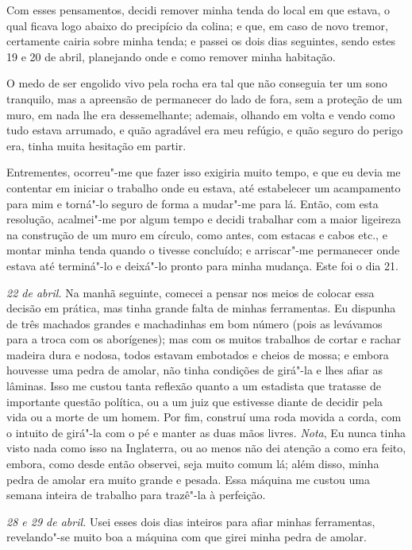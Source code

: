 Com esses pensamentos, decidi remover minha tenda do local em que
estava, o qual ficava logo abaixo do precipício da colina; e que, em
caso de novo tremor, certamente cairia sobre minha tenda; e passei os
dois dias seguintes, sendo estes 19 e 20 de abril, planejando onde e
como remover minha habitação.

O medo de ser engolido vivo pela rocha era tal que não conseguia ter um
sono tranquilo, mas a apreensão de permanecer do lado de fora, sem a
proteção de um muro, em nada lhe era dessemelhante; ademais, olhando em
volta e vendo como tudo estava arrumado, e quão agradável era meu
refúgio, e quão seguro do perigo era, tinha muita hesitação em partir.

Entrementes, ocorreu"-me que fazer isso exigiria muito tempo, e que eu
devia me contentar em iniciar o trabalho onde eu estava, até estabelecer
um acampamento para mim e torná"-lo seguro de forma a mudar"-me para lá.
Então, com esta resolução, acalmei"-me por algum tempo e decidi trabalhar
com a maior ligeireza na construção de um muro em círculo, como antes,
com estacas e cabos etc., e montar minha tenda quando o tivesse
concluído; e arriscar"-me permanecer onde estava até terminá"-lo e
deixá"-lo pronto para minha mudança. Este foi o dia 21.

\emph{22 de abril.} Na manhã seguinte, comecei a pensar nos meios de
colocar essa decisão em prática, mas tinha grande falta de minhas
ferramentas. Eu dispunha de três machados grandes e machadinhas em bom
número (pois as levávamos para a troca com os aborígenes); mas com os
muitos trabalhos de cortar e rachar madeira dura e nodosa, todos estavam
embotados e cheios de mossa; e embora houvesse uma pedra de amolar, não
tinha condições de girá"-la e lhes afiar as lâminas. Isso me custou tanta
reflexão quanto a um estadista que tratasse de importante questão
política, ou a um juiz que estivesse diante de decidir pela vida ou a
morte de um homem. Por fim, construí uma roda movida a corda, com o
intuito de girá"-la com o pé e manter as duas mãos livres. \emph{Nota},
Eu nunca tinha visto nada como isso na Inglaterra, ou ao menos não dei
atenção a como era feito, embora, como desde então observei, seja muito
comum lá; além disso, minha pedra de amolar era muito grande e pesada.
Essa máquina me custou uma semana inteira de trabalho para trazê"-la à
perfeição.

\emph{28 e 29 de abril.} Usei esses dois dias inteiros para afiar minhas
ferramentas, revelando"-se muito boa a máquina com que girei minha pedra
de amolar.

